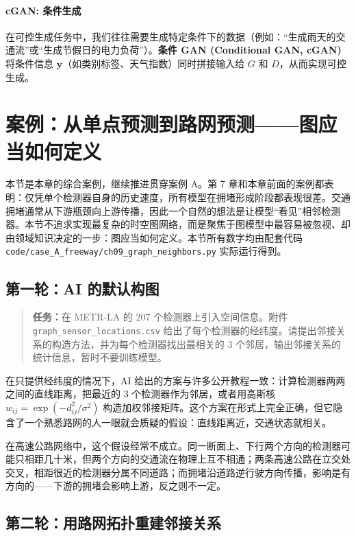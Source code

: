 \paragraph{cGAN: 条件生成}
在可控生成任务中，我们往往需要生成特定条件下的数据（例如：“生成雨天的交通流”或“生成节假日的电力负荷”）。\textbf{条件 GAN (Conditional GAN, cGAN)} 将条件信息 $\mathbf{y}$（如类别标签、天气指数）同时拼接输入给 $G$ 和 $D$，从而实现可控生成。

\section{案例：从单点预测到路网预测——图应当如何定义}
\label{sec:ch9_case}

本节是本章的综合案例，继续推进贯穿案例 A。第 7 章和本章前面的案例都表明：仅凭单个检测器自身的历史速度，所有模型在拥堵形成阶段都表现很差。交通拥堵通常从下游瓶颈向上游传播，因此一个自然的想法是让模型“看见”相邻检测器。本节不追求实现最复杂的时空图网络，而是聚焦于图模型中最容易被忽视、却由领域知识决定的一步：图应当如何定义。本节所有数字均由配套代码 \texttt{code/case\_A\_freeway/ch09\_graph\_neighbors.py} 实际运行得到。

\subsection{第一轮：AI 的默认构图}

\begin{quote}
\textbf{任务：}在 METR-LA 的 207 个检测器上引入空间信息。附件 \texttt{graph\_sensor\_locations.csv} 给出了每个检测器的经纬度。请提出邻接关系的构造方法，并为每个检测器找出最相关的 3 个邻居，输出邻接关系的统计信息，暂时不要训练模型。
\end{quote}

在只提供经纬度的情况下，AI 给出的方案与许多公开教程一致：计算检测器两两之间的直线距离，把最近的 3 个检测器作为邻居，或者用高斯核 $w_{ij}=\exp(-d_{ij}^2/\sigma^2)$ 构造加权邻接矩阵。这个方案在形式上完全正确，但它隐含了一个熟悉路网的人一眼就会质疑的假设：直线距离近，交通状态就相关。

在高速公路网络中，这个假设经常不成立。同一断面上、下行两个方向的检测器可能只相距几十米，但两个方向的交通流在物理上互不相通；两条高速公路在立交处交叉，相距很近的检测器分属不同道路；而拥堵沿道路逆行驶方向传播，影响是有方向的——下游的拥堵会影响上游，反之则不一定。

\subsection{第二轮：用路网拓扑重建邻接关系}

